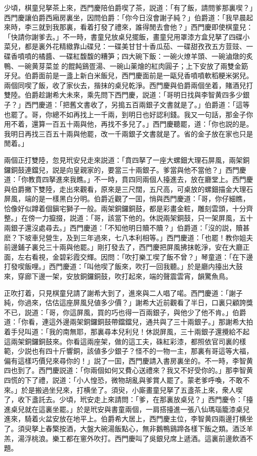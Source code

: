 少頃，棋童兒拏茶上來，西門慶陪伯爵喫了茶，説道：「有了飯，請問爹那裏喫？」西門慶讓伯爵西廂房裏坐，因問伯爵：「你今日沒會謝子純？」伯爵道：「我早晨起來時，李三就到我那裏，看着打發了禮來，誰得閒去會他？」西門慶即使棋童兒：「快請你謝爹去。」不一時，書童兒放桌兒擺飯，畫童兒用罩漆方盒兒拏了四碟小菜兒，都是裏外花精緻靠山碟兒：一碟美甘甘十香瓜茄、一碟甜孜孜五方荳豉、一碟香噴噴的橘醬、一碟紅馥馥的糟笋；四大碗下飯：一碗火燎羊頭、一碗滷燉的炙鴨、一碗黄芽菜並𤆑的餛飩鷄疍湯、一碗山薬燴的紅肉圓子；上下安放了兩雙金筯牙兒。伯爵面前是一盞上新白米飯兒，西門慶面前是一甌兒香噴噴軟稻粳米粥兒。兩個同喫了飯，收了家伙去，揩抹的桌兒乾淨。西門慶與伯爵兩個坐着，賭酒兒打雙陸。伯爵趁謝希大未來，乘先問下西門慶，説道：「哥明日找與李智黄四多少銀子？」西門慶道：「把舊文書收了，另搗五百兩銀子文書就是了。」伯爵道：「這等也罷了。哥，你總不如再找上一千兩，到明日也好認利錢。我又一句話，那金子你用不着，還算一百五十兩與他，再找不多兒了。」西門慶聽罷，道：「你也説的是。我明日再找三百五十兩與他罷，改一千兩銀子文書就是了。省的金子放在家也只是閒着。」

兩個正打雙陸，忽見玳安兒走來説道：「賁四拏了一座大螺鈿大理石屏風，兩架銅鑼銅鼓連鐺兒，説是向皇親家的，要當三十兩銀子。爹當與他不當他？」西門慶道：「你教賁四拏進來我瞧。」不一時，賁四同兩個人擡進去，放在廳堂上。西門慶與伯爵撇下雙陸，走出來觀看，原來是三尺闊，五尺高，可桌放的螺鈿描金大理石屏風，端的是一樣黑白分明。伯爵近觀了一囬，悄與西門慶道：「哥，你仔細瞧，恰像好似蹲着個鎭宅獅子一般。兩架銅鑼銅鼓，都是彩畫金粧，雕刻雲頭，十分齊整。」在傍一力攛掇，説道：「哥，該當下他的。休説兩架銅鼓，只一架屏風，五十兩銀子還沒處尋去。」西門慶道：「不知他明日贖不贖？」伯爵道：「沒的説，贖甚麽？下坡車兒營生，及到三年過來，七八本利相等。」西門慶道：「也罷！教你姐夫前邊鋪子裏兑三十兩與他罷。」剛打發去了，西門慶把屏風拂抹乾淨，安在大廳正面，左右看視，金碧彩霞交輝。因問：「吹打樂工喫了飯不曾？」琴童道：「在下邊打發喫飯哩。」西門慶道：「叫他喫了飯來，吹打一回我聽。」於是廳内擡出大鼓來，穿廊下邊一架，安放銅鑼銅鼓，吹打起來，端的聲震雲宵，韻驚魚鳥。

正吹打着，只見棋童兒請了謝希大到了，進來與二人唱了喏。西門慶道：「謝子純，你過來，估估這座屏風兒値多少價？」謝希大近前觀看了半日，口裏只顧誇獎不已，説道：「哥，你這屏風，買的巧也得一百兩銀子，與他少了他不肯。」伯爵道：「你看，連這外邊兩架銅鑼銅鼓帶鐺鐺兒，通共與了三十兩銀子。」那謝希大拍着手兒叫道：「我的南無耶，那裏尋本兒利兒！休説屏風，三十兩銀子還攪給不起這兩架銅鑼銅鼓來。你看這兩座架，做的這工夫，硃紅彩漆，都照依官司裏的樣範，少説也有四十斤響銅，該値多少銀子？怪不的一物一主，那裏有哥這等大福，偏有這樣巧價兒來尋你的！」説了一囬，西門慶請入書房裏坐的。不一時，李智黄四也到了。西門慶説道：「你兩個如何又費心送禮來？我又不好受你的。」那李智黄四慌的下了禮，説道：「小人惶恐，微物胡亂與爹賞人罷了。蒙老爹呼喚，不敢不來。」於是搬過坐兒來，打横坐了。須臾，小廝畫童兒拏了五盞茶上來，衆人喫了，收下盞託去。少頃，玳安走上來請問：「爹，在那裏放桌兒？」西門慶令：「擡進桌兒就在這裏坐罷。」於是玳安與書童兩個，一肩搭擡進一張八仙瑪瑙籠漆桌兒進來，騎着火盆安放在地平上。伯爵希大居上，西門慶主位，李智黄四兩邊打横坐了。須臾拏上春檠按酒，大盤大碗湯飯點心，無非鵝鴨鷄蹄各樣下飯之類。酒泛羊羔，湯浮桃浪。樂工都在窻外吹打。西門慶叫了吳銀兒席上遞酒。這裏前邊飲酒不題。


